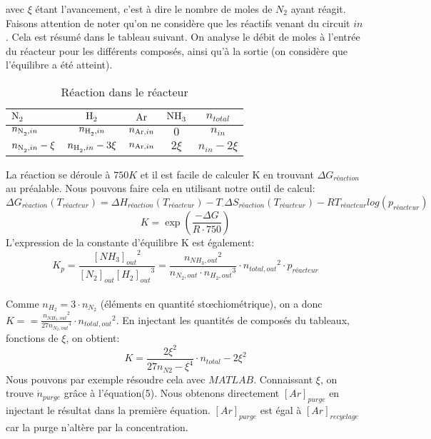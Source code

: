 \documentclass[a4paper, oneside, 12pt]{article}
\begin{document}
avec $\xi$ étant l'avancement, c'est à dire le nombre de moles de $N_2$ ayant réagit. Faisons attention de noter qu'on ne considère que les réactifs venant du circuit $in$. Cela est résumé dans le tableau suivant. On analyse le débit de moles à l'entrée du réacteur pour les différents composés, ainsi qu'à la sortie (on considère que l'équilibre a été atteint).
\begin{table}
	\centering
	\begin{tabular}{l|c|c|c|c}
		$\ce{N2}$ & $\ce{H2}$ & $\ce{Ar}$ & $\ce{NH3}$ & $n_{total}$ \\
		\hline
		$n_{\ce{N2},in}$ & $n_{\ce{H2},in}$ & $n_{\ce{Ar},in}$ & $0$  & $n_{in}$\\
		$n_{\ce{N2},in}-\xi$ & $n_{\ce{H2},in}-3\xi$ & $n_{\ce{Ar},in}$ & $2\xi$  & $n_{in}-2\xi$\\
	\end{tabular}
	\caption{Réaction dans le réacteur}
	\label{tab:reaction1_primaire}
\end{table}
La réaction se déroule à $750K$ et il est facile de calculer K en trouvant $\Delta G_{réaction}$ au préalable. Nous pouvons faire cela en utilisant notre outil de calcul:\\
$$\Delta G_{réaction}(T_{réacteur})=\Delta H_{réaction}(T_{réacteur})-T_\cdot \Delta S_{réaction}(T_{réacteur})-RT_{réacteur}log(p_{réacteur})$$
$$K=\exp(\frac{-\Delta G}{R\cdot 750})$$
L'expression de la constante d'équilibre K est également: \\
$$K_p=\frac{{[NH_3]_{out}}^2}{[N_2]_{out}{[H_2]_{out}}^3}=\frac{{n_{NH_3,out}}^2}{n_{N_2,out}\cdot {n_{H_2,out}}^3}\cdot {n_{total,out}}^2\cdot p_{réacteur}$$\\
Comme $n_{H_2}=3\cdot n_{N_2}$ (éléments en quantité stœchiométrique), on a donc 
$K==\frac{{n_{NH_3,out}}^2}{27{n_{N_2,out}}^4}\cdot {n_{total,out}}^2$. En injectant les 
quantités de composés du tableaux, fonctions de $\xi$, on obtient:\\
$$K=\frac{{2\xi}^2}{27{{n_{N2}-\xi}^4}}\cdot {n_{total}-2\xi}^2$$
Nous pouvons par exemple résoudre cela avec $MATLAB$. Connaissant $\xi$, on trouve 
$\dot{n}_{purge}$ grâce à l'équation(5). Nous obtenons directement $[Ar]_{purge}$ en 
injectant le résultat dans la première équation. $[Ar]_{purge}$ est égal à $[Ar]_{recyclage}$ car la purge n'altère par la concentration.\\
\end{document}
